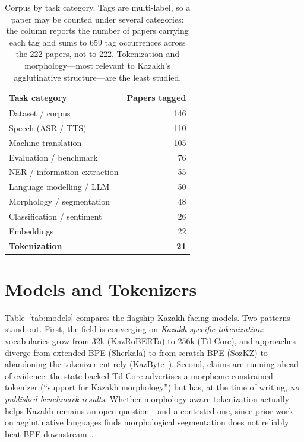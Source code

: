 \documentclass{article}
\begin{document}
\begin{table}[t]
  \centering
  \begin{tabular}{lr}
    \toprule
    \textbf{Task category} & \textbf{Papers tagged} \\
    \midrule
    Dataset / corpus      & 146 \\
    Speech (ASR / TTS)    & 110 \\
    Machine translation   & 105 \\
    Evaluation / benchmark & 76 \\
    NER / information extraction & 55 \\
    Language modelling / LLM & 50 \\
    Morphology / segmentation & 48 \\
    Classification / sentiment & 26 \\
    Embeddings            & 22 \\
    \textbf{Tokenization} & \textbf{21} \\
    \bottomrule
  \end{tabular}
  \caption{Corpus by task category. Tags are multi-label, so a paper may be counted under
  several categories: the column reports the number of papers carrying each tag and sums to
  659 tag occurrences across the 222 papers, not to 222. Tokenization and
  morphology---most relevant to Kazakh's agglutinative structure---are the least studied.}
  \label{tab:categories}
\end{table}

\section{Models and Tokenizers}
\label{sec:models}
Table~\ref{tab:models} compares the flagship Kazakh-facing models. Two patterns stand out.
First, the field is converging on \emph{Kazakh-specific tokenization}: vocabularies grow
from 32k (KazRoBERTa) to 256k (Til-Core), and approaches diverge from extended BPE
(Sherkala) to from-scratch BPE (SozKZ) to abandoning the tokenizer entirely
(KazByte~\cite{kazbyte}). Second, claims are running ahead of evidence: the state-backed
Til-Core advertises a morpheme-constrained tokenizer (``support for Kazakh morphology'')
but has, at the time of writing, \emph{no published benchmark results}. Whether
morphology-aware tokenization actually helps Kazakh remains an open question---and a
contested one, since prior work on agglutinative languages finds morphological
segmentation does not reliably beat BPE downstream~\cite{saleva}.
\end{document}

